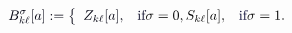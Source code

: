 \documentclass[12pt]{article}
\begin{document}
\makeatletter
\renewcommand*{\@textcolor}[3]{%
  \protect\leavevmode
  \begingroup
    \color#1{#2}#3%
  \endgroup
}
\makeatother
\begin{displaymath}
\mathcolor[RGB]{0,0,15}{B_{k\ell}^{\sigma}[a]:=\left\{\begin{array}[c]{ccc}Z_{k\ell}[a],} & \mathcolor[RGB]{0,0,30}{\text{if} }\sigma=0,S_{k\ell}[a], & \mathcolor[RGB]{0,0,45}{\text{if} }\sigma=1.\end{array}\right.
\end{displaymath}
\end{document}
